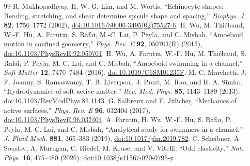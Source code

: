 \documentclass[preprint,amsmath,amssymb,aps,prl,superscriptaddress,nofootinbib,floatfix]{revtex4-2}
\begin{document}
\begin{thebibliography}{99}
 R. Mukhopadhyay, H. W. G. Lim, and M. Wortis, ``Echinocyte shapes: Bending, stretching, and shear determine spicule shape and spacing,'' \emph{Biophys. J.} \textbf{82}, 1756--1772 (2002), \href{https://doi.org/10.1016/S0006-3495(02)75527-6}{doi:10.1016/S0006-3495(02)75527-6}.
 H. Wu, M. Thi\'{e}baud, W.-F. Hu, A. Farutin, S. Rafa\"{\i}, M.-C. Lai, P. Peyla, and C. Misbah, ``Amoeboid motion in confined geometry,'' \emph{Phys. Rev. E} \textbf{92}, 050701(R) (2015), \href{https://doi.org/10.1103/PhysRevE.92.050701}{doi:10.1103/PhysRevE.92.050701}.
 H. Wu, A. Farutin, W.-F. Hu, M. Thi\'{e}baud, S. Rafa\"{\i}, P. Peyla, M.-C. Lai, and C. Misbah, ``Amoeboid swimming in a channel,'' \emph{Soft Matter} \textbf{12}, 7470--7484 (2016), \href{https://doi.org/10.1039/C6SM01235F}{doi:10.1039/C6SM01235F}.
 M. C. Marchetti, J. F. Joanny, S. Ramaswamy, T. B. Liverpool, J. Prost, M. Rao, and R. A. Simha, ``Hydrodynamics of soft active matter,'' \emph{Rev. Mod. Phys.} \textbf{85}, 1143--1189 (2013), \href{https://doi.org/10.1103/RevModPhys.85.1143}{doi:10.1103/RevModPhys.85.1143}.
 G. Salbreux and F. J\"ulicher, ``Mechanics of active surfaces,'' \emph{Phys. Rev. E} \textbf{96}, 032404 (2017), \href{https://doi.org/10.1103/PhysRevE.96.032404}{doi:10.1103/PhysRevE.96.032404}.
 A. Farutin, H. Wu, W.-F. Hu, S. Rafa\"{\i}, P. Peyla, M.-C. Lai, and C. Misbah, ``Analytical study for swimmers in a channel,'' \emph{J. Fluid Mech.} \textbf{881}, 365--383 (2019), \href{https://doi.org/10.1017/jfm.2019.782}{doi:10.1017/jfm.2019.782}.
 C. Scheibner, A. Souslov, A. Murugan, C. Riedel, M. Kruse, and V. Vitelli, ``Odd elasticity,'' \emph{Nat. Phys.} \textbf{16}, 475--480 (2020), \href{https://doi.org/10.1038/s41567-020-0795-y}{doi:10.1038/s41567-020-0795-y}.
\end{thebibliography}
\end{document}
